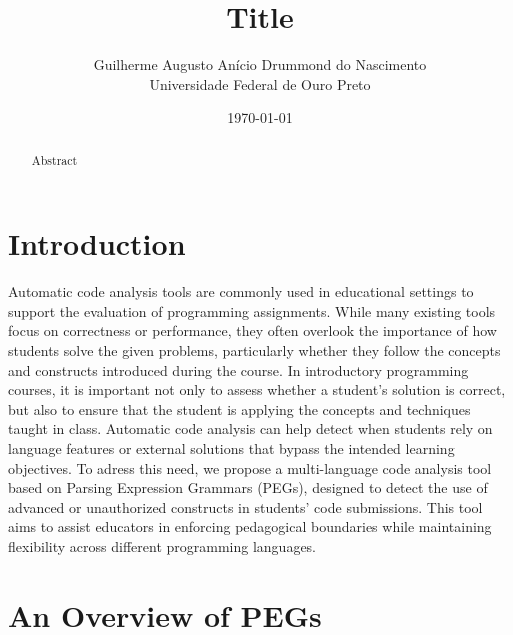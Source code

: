 \documentclass[10pt,sigplan,screen,review,anonymous]{acmart}
\title{Title}
\author{Guilherme Augusto Anício Drummond do Nascimento \\ Universidade Federal de Ouro Preto}
\date{\today}
\begin{document}
\begin{abstract}
    Abstract
\end{abstract}

\maketitle

% 
\section{Introduction}
Automatic code analysis tools are commonly used in educational settings to
support the evaluation of programming assignments. While many existing tools
focus on correctness or performance, they often overlook the importance of
how students solve the given problems, particularly whether they follow the
concepts and constructs introduced during the course. 
In introductory programming courses, it is important not only to assess 
whether a student's solution is correct, but also to ensure that the 
student is applying the concepts and techniques taught in class. 
Automatic code analysis can help detect when students rely on language 
features or external solutions that bypass the intended learning objectives.
To adress this need, we propose a multi-language code analysis tool based on 
Parsing Expression Grammars (PEGs), designed to detect the use of advanced 
or unauthorized constructs in students' code submissions. This tool aims to 
assist educators in enforcing pedagogical boundaries while maintaining 
flexibility across different programming languages.

\section{An Overview of PEGs}
\end{document}
